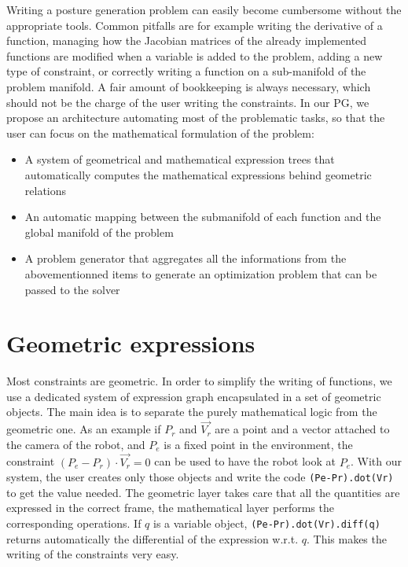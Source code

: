 Writing a posture generation problem can easily become cumbersome without the appropriate tools.
Common pitfalls are for example writing the derivative of a function, managing how the Jacobian matrices of the already implemented functions are modified when a variable is added to the problem, adding a new type of constraint, or correctly writing a function on a sub-manifold of the problem manifold.
A fair amount of bookkeeping is always necessary, which should not be the charge of the user writing the constraints.
In our PG, we propose an architecture automating most of the problematic tasks, so that the user can focus on the mathematical formulation of the problem:
\begin{itemize}
  \item A system of geometrical and mathematical expression trees that automatically computes the mathematical expressions behind geometric relations
  \item An automatic mapping between the submanifold of each function and the global manifold of the problem
  \item A problem generator that aggregates all the informations from the abovementionned items to generate an optimization problem that can be passed to the solver
\end{itemize}


\section{Geometric expressions}
\label{sec:geometric_expressions}

Most constraints are geometric.
In order to simplify the writing of functions, we use a dedicated system of expression graph encapsulated in a set of geometric objects.
The main idea is to separate the purely mathematical logic from the geometric one.
As an example if $P_r$ and $\overrightarrow{V_r}$ are a point and a vector attached to the camera of the robot, and $P_e$ is a fixed point in the environment, the constraint $(P_e - P_r)\cdot \overrightarrow{V_r} = 0$ can be used to have the robot look at $P_e$.
With our system, the user creates only those objects and write the code {\tt (Pe-Pr).dot(Vr)} to get the value needed.
The geometric layer takes care that all the quantities are expressed in the correct frame, the mathematical layer performs the corresponding operations.
If $q$ is a variable object, {\tt (Pe-Pr).dot(Vr).diff(q)} returns automatically the differential of the expression w.r.t. $q$. This makes the writing of the constraints very easy.

